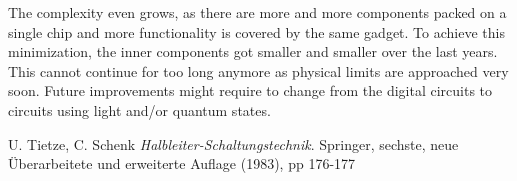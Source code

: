 \documentclass[journal]{IEEEtran}
\begin{document}
The complexity even grows, as there are more and
more components packed on a single chip and more functionality is
covered by the same gadget. To achieve this minimization, the inner components
got smaller and smaller over the last years. This cannot continue for too long
anymore as physical limits are approached very soon. Future
improvements might require to change from the digital 
circuits to circuits using light and/or quantum states.

\begin{thebibliography}{------}
	U. Tietze, C. Schenk
	{\em Halbleiter-Schaltungstechnik}.
	Springer, sechste, neue Überarbeitete und erweiterte Auflage (1983), pp
	176-177
\end{thebibliography}
\end{document}
